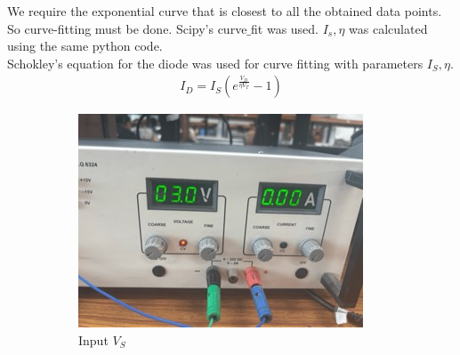 \documentclass[12pt,a4paper]{article}
\begin{document}
\newline We require the exponential curve that is closest to all the obtained data points. So curve-fitting must be done. Scipy's curve$\_$fit was used. $I_s, \eta$ was calculated using the same python code.\\
Schokley's equation for the diode was used for curve fitting with parameters $I_S, \eta$.
\begin{align*}
    I_D = I_S(e^{\frac{V_D}{\eta V_T}} - 1)
\end{align*}
\pagebreak
\begin{figure}[h!]
\centering
\begin{subfigure}[b]{0.47\linewidth}
    \centering
    \includegraphics[width=\textwidth]{Experiment_5/figs/iv_dc_1 Small.jpeg}
    \caption{Input $V_S$}
\end{subfigure}
\begin{subfigure}[b]{0.48\linewidth}
    \centering

\end{subfigure}
\end{figure}
\end{document}
